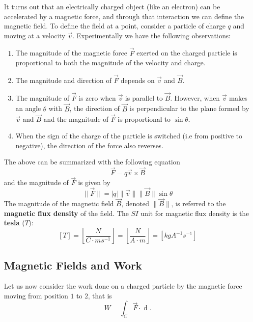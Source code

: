 It turns out that an electrically charged object (like an electron) can be accelerated by a magnetic force, and through that interaction we can define the magnetic field. To define the field at a point, consider a particle of charge $q$ and moving at a velocity $\vec{v}$. Experimentally we have the following observations:
\begin{enumerate}
    \item The magnitude of the magnetic force $\vec{F}$ exerted on the charged particle is proportional to both the magnitude of the velocity and charge.
    \item The magnitude and direction of $\vec{F}$ depends on $\vec{v}$ and $\vec{B}$.
    \item The magnitude of $\vec{F}$ is zero when $\vec{v}$ is parallel to $\vec{B}$. However, when $\vec{v}$ makes an angle $\theta$ with $\vec{B}$, the direction of $\vec{B}$ is perpendicular to the plane formed by $\vec{v}$ and $\vec{B}$ and the magnitude of $\vec{F}$ is proportional to $\sin \theta$.
    \item When the sign of the charge of the particle is switched (i.e from positive to negative), the direction of the force also reverses. 
\end{enumerate}
The above can be summarized with the following equation
\begin{equation}
    \vec{F} = q\vec{v} \times \vec{B}
\end{equation}
and the magnitude of $\vec{F}$ is given by
\begin{equation}
    \| \vec{F} \| = |q|\| \vec{v}\|\|\vec{B}\| \sin \theta
\end{equation}
The magnitude of the magnetic field $\vec{B}$, denoted $\| \vec{B} \|$, is referred to the \textbf{magnetic flux density} of the field. The $SI$ unit for magnetic flux density is the \textbf{tesla} ($T$):
\begin{equation}
    \left[T\right] = \left[\frac{N}{C \cdot ms^{-1}}\right] = \left[\frac{N}{A \cdot m}\right] = \left[kgA^{-1}s^{-1}\right]
\end{equation}

\subsection{Magnetic Fields and Work}

Let us now consider the work done on a charged particle by the magnetic force moving from position $1$ to $2$, that is
\begin{equation}
    W = \int_C \vec{F} \cdot \mathop{\mathrm{d}\vec{s}}. 
\end{equation}

